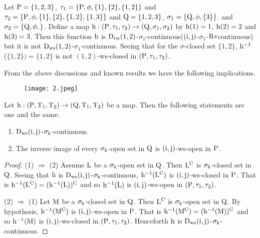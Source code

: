 \begin{exm}\label{exam8.5.12}
Let $\mathrm{P}=\{1,2,3\}$, $\tau_1 =\{\mathrm{P}, \phi, \{1\}, \{2\}, \{1,2\}\}$ and $\tau_2 =\{\TSP, \phi, \{1\},\break \{2\},\{1,2\},\{1,3\}\}$ and $\mathrm{Q}=\{1,2,3\}$, $\sigma_{1} =\{\mathrm{Q}, \phi, \{3\}\}$. and $\sigma_{2} =\{\mathrm{Q}, \phi, \}$. Define a map $\mathrm{h}:(\mathrm{P}, \tau_1, \tau_2 )\to (\mathrm{Q}, \sigma_{1}, \sigma_{2} )$ by $\mathrm{h}(1)=1$, $\mathrm{h}(2)=2$ and $\mathrm{h}(3)=3$. Then this function $\mathrm{h}$ is $\mathrm{D}_{\mathrm{rw}} (1, 2)$-$\sigma_{1}$-continuous($(\mathrm{i}, \mathrm{j})$-$\sigma_{1}$-$\mathrm{R}*$continuous) but it is not $\mathrm{D}_{\mathrm{ws}} (1, 2)$-$\sigma_{1}$-continuous. Seeing that for the $\sigma$-closed set $\{1,2\}$, $\mathrm{h}^{-1}$ ($\{1,2\})=\{1,2\}$ is not $(1, 2)$-ws-closed in $(\mathrm{P}, \tau_1, \tau_2 )$.
\end{exm}

\begin{rem}\label{rem8.5.3}
From the above discussions and known results we have the following implications.
\begin{figure}[H]
\centering
\texttt{[image: 2.jpeg]}
\end{figure}
\end{rem}

\begin{thm}\label{thm8.5.11}
Let $\mathrm{h}:(\mathrm{P},\mathrm{T}_{1},\mathrm{T}_{2})\to (\mathrm{Q},\mathrm{T}_{1},\mathrm{T}_{2})$ be a map. Then the following statements are one and the same.
\begin{enumerate}[(1)]
\item $\mathrm{D}_{\mathrm{ws}} (\mathrm{i}, \mathrm{j})$-$\sigma_{\mathrm{k}}$-continuous.

\item The inverse image of every $\sigma_{\mathrm{k}}$-open set in $\mathrm{Q}$ is $(\mathrm{i}, \mathrm{j})$-ws-open in $\mathrm{P}$.
\end{enumerate}
\end{thm}

\begin{proof}
(1) $\Rightarrow$  (2) Assume $\mathrm{L}$ be a $\sigma_{\mathrm{k}}$-open set in $\mathrm{Q}$. Then $\mathrm{L}^{\text{C}}$ is $\sigma_{\mathrm{k}}$-closed set in $\mathrm{Q}$. Seeing that $\mathrm{h}$ is $\mathrm{D}_{\mathrm{ws}}(\mathrm{i}, \mathrm{j})$-$\sigma_{\mathrm{k}}$-continuous, $\mathrm{h}^{-1} (\mathrm{L}^{\text{C}})$ is $(\mathrm{i}, \mathrm{j})$-ws-closed in $\mathrm{P}$. That is $\mathrm{h}^{-1} (\mathrm{L}^{\text{C}})=(\mathrm{h}^{-1} (\mathrm{L}))^{\text{C}}$ and so $\mathrm{h}^{-1} (\mathrm{L})$ is $(\mathrm{i}, \mathrm{j})$-ws-open in $(\mathrm{P}, \tau_1, \tau_2 )$.

(2) $\Rightarrow$  (1) Let $\mathrm{M}$ be a $\sigma_{\mathrm{k}}$-closed set in $\mathrm{Q}$. Then $\mathrm{L}^{\text{C}}$ is $\sigma_{\mathrm{k}}$-open set in $\mathrm{Q}$. By hypothesis, $\mathrm{h}^{-1} (\mathrm{M}^{\text{C}})$ is $(\mathrm{i}, \mathrm{j})$-ws-open in $\mathrm{P}$. That is $\mathrm{h}^{-1} (\mathrm{M}^{\text{C}}) = (\mathrm{h}^{-1} (\mathrm{M}))^{\text{C}}$ and so $\mathrm{h}^{-1} (\mathrm{M})$ is $(\mathrm{i}, \mathrm{j})$-ws-closed in $(\mathrm{P}, \tau_1, \tau_2 )$. Henceforth $\mathrm{h}$ is $\mathrm{D}_{\mathrm{ws}}(\mathrm{i}, \mathrm{j})$-$\sigma_{\mathrm{k}}$-continuous.
\end{proof}

